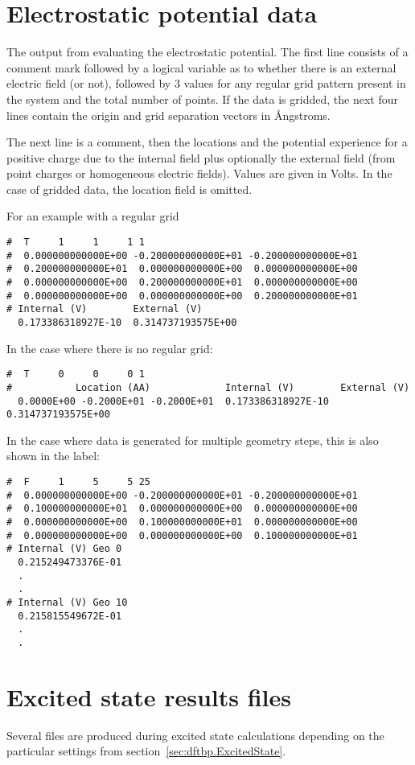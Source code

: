 \section{Electrostatic potential data}
\label{sec:dftbp.esp}

The output from evaluating the electrostatic potential. The first line
consists of a comment mark followed by a logical variable as to whether there is
an external electric field (or not), followed by 3 values for any regular grid
pattern present in the system and the total number of points. If the data is
gridded, the next four lines contain the origin and grid separation vectors in
{\AA}ngstroms.

The next line is a comment, then the locations and the potential experience for
a positive charge due to the internal field plus optionally the external field
(from point charges or homogeneous electric fields). Values are given in
Volts. In the case of gridded data, the location field is omitted.

For an example with a regular grid
\begin{verbatim}
#  T     1     1     1 1
#  0.000000000000E+00 -0.200000000000E+01 -0.200000000000E+01
#  0.200000000000E+01  0.000000000000E+00  0.000000000000E+00
#  0.000000000000E+00  0.200000000000E+01  0.000000000000E+00
#  0.000000000000E+00  0.000000000000E+00  0.200000000000E+01
# Internal (V)        External (V)
  0.173386318927E-10  0.314737193575E+00
\end{verbatim}

In the case where there is no regular grid:
\begin{verbatim}
#  T     0     0     0 1
#           Location (AA)             Internal (V)        External (V)
  0.0000E+00 -0.2000E+01 -0.2000E+01  0.173386318927E-10  0.314737193575E+00
\end{verbatim}

In the case where data is generated for multiple geometry steps, this is also
shown in the label:
\begin{verbatim}
#  F     1     5     5 25
#  0.000000000000E+00 -0.200000000000E+01 -0.200000000000E+01
#  0.100000000000E+01  0.000000000000E+00  0.000000000000E+00
#  0.000000000000E+00  0.100000000000E+01  0.000000000000E+00
#  0.000000000000E+00  0.000000000000E+00  0.100000000000E+01
# Internal (V) Geo 0
  0.215249473376E-01
  .
  .
# Internal (V) Geo 10
  0.215815549672E-01
  .
  .
\end{verbatim}

\section{Excited state results files}
\label{sec:tddftb_lr}
Several files are produced during excited state calculations depending on the
particular settings from section~\ref{sec:dftbp.ExcitedState}.

